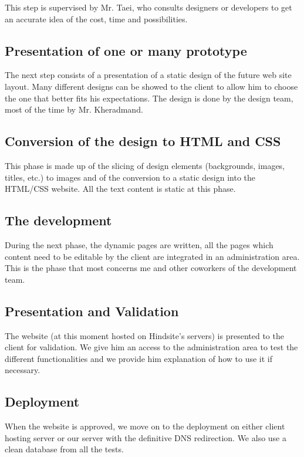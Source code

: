 This step is supervised by Mr. Taei, who consults designers or developers to
get an accurate idea of the cost, time and possibilities.

\subsection*{Presentation of one or many prototype}
The next step consists of a presentation of a static design of the future web
site layout. Many different designs can be showed to the client to allow him to
choose the one that better fits his expectations.
The design is done by the design team, most of the time by Mr. Kheradmand.

\subsection*{Conversion of the design to HTML and CSS}
This phase is made up of the slicing of design elements (backgrounds,
images, titles, etc.) to images and of the conversion to a static design into the
HTML/CSS website. All the text content is static at this phase.

\subsection*{The development}
During the next phase, the dynamic pages are written, all the pages which
content need to be editable by the client are integrated in an administration
area. This is the phase that most concerns me and other coworkers of the
development team.

\subsection*{Presentation and Validation}
The website (at this moment hosted on Hindsite’s servers) is presented to the
client for validation. We give him an access to the administration area to test
the different functionalities and we provide him explanation of how to use it if
necessary.

\subsection*{Deployment}
When the website is approved, we move on to the deployment on either client
hosting server or our server with the definitive DNS redirection. We also use a
clean database from all the tests.
